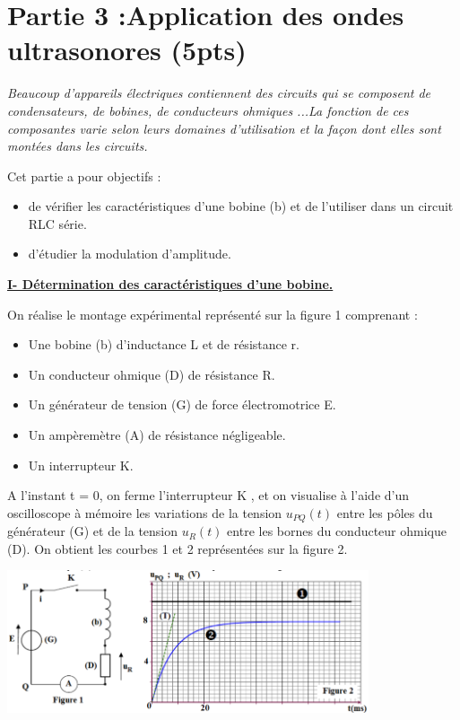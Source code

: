 \documentclass[12pt]{article}
\begin{document}
\section*{Partie 3 :Application des ondes ultrasonores \dotfill(5pts)}

\emph{Beaucoup d’appareils électriques contiennent des circuits qui se composent de condensateurs, de
bobines, de conducteurs ohmiques ...La fonction de ces composantes varie selon leurs domaines
d’utilisation et la façon dont elles sont montées dans les circuits.}

Cet partie a pour objectifs :
\begin{itemize}
	\item de vérifier les caractéristiques d’une bobine (b) et de l’utiliser dans un circuit RLC série.
	\item  d’étudier la modulation d’amplitude.
\end{itemize}


\textbf{\underline{I- Détermination des caractéristiques d’une bobine.}}

On réalise le montage expérimental représenté sur la figure 1 comprenant :
\begin{itemize}
	\item  Une bobine (b) d’inductance L et de résistance r.
	\item  Un conducteur ohmique (D) de résistance R.
	\item  Un générateur de tension (G) de force électromotrice E.
	\item  Un ampèremètre (A) de résistance négligeable.
	\item  Un interrupteur K.
\end{itemize}

A l’instant t = 0, on ferme l’interrupteur K , et on visualise à l’aide d’un oscilloscope à mémoire les
variations de la tension $u_{PQ}(t)$ entre les pôles du générateur (G) et de la tension $u_R(t)$ entre les bornes du conducteur ohmique (D). On obtient les courbes 1 et 2 représentées sur la figure 2.


\begin{center}
  \includegraphics[width=0.8\textwidth]{./img/Rl01.png}
\end{center}
\end{document}
